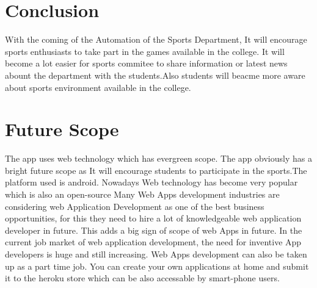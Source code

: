 \section{Conclusion}
With the coming of the Automation of the Sports Department, It will encourage sports enthusiasts to take part in the games available in the college. It will become a lot easier for sports commitee to share information or latest news abount the department with the students.Also students will beacme more aware about sports environment available in the college. 

\section{Future Scope}
The app uses web technology which has evergreen scope. The app obviously has a bright
future scope as It will encourage students to participate in the sports.The platform used is
android. Nowadays Web technology has become very popular which is also an open-source
Many Web Apps development industries are considering web Application Development as one of the best business opportunities, for this they need to hire a lot of knowledgeable
web application developer in future. This adds a big sign of scope of web Apps in future.
In the current job market of web application development, the need for inventive App
developers is huge and still increasing. Web Apps development can also be taken up as
a part time job. You can create your own applications at home and submit it to the heroku store which can be also accessable by smart-phone users.